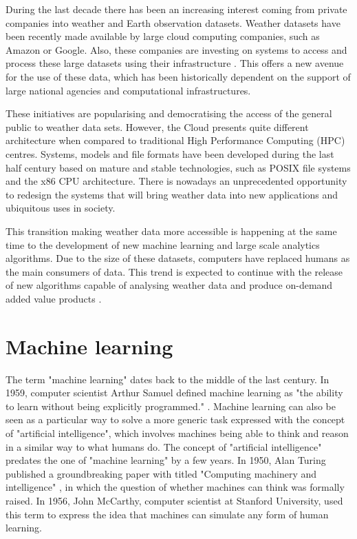 \medskip

During the last decade there has been an increasing interest coming from private companies into weather and Earth observation datasets. Weather datasets have been recently made available by large cloud computing companies, such as Amazon or Google. Also, these companies are investing on systems to access and process these large datasets using their infrastructure \citep{gorelick2017google,earthaws}. This offers a new avenue for the use of these data, which has been historically dependent on the support of large national agencies and computational infrastructures.

\medskip

These initiatives are popularising and democratising the access of the general public to weather data sets. However, the Cloud presents quite different architecture when compared to traditional High Performance Computing (HPC) centres. Systems, models and file formats have been developed during the last half century based on mature and stable technologies, such as POSIX file systems and the x86 CPU architecture. There is nowadays an unprecedented opportunity to redesign the systems that will bring weather data into new applications and ubiquitous uses in society.

\medskip

This transition making weather data more accessible is happening at the same time to the development of new machine learning and large scale analytics algorithms. Due to the size of these datasets, computers have replaced humans as the main consumers of data. This trend is expected to continue with the release of new algorithms capable of analysing weather data and produce on-demand added value products \citep{cloudai,awsml}.


\section{Machine learning}

The term "machine learning" dates back to the middle of the last century. In 1959, computer scientist Arthur Samuel defined machine learning as "the ability to learn without being explicitly programmed." \citep{samuel1959some}. Machine learning can also be seen as a particular way to solve a more generic task expressed with the concept of "artificial intelligence", which involves machines being able to think and reason in a similar way to what humans do. The concept of "artificial intelligence" predates the one of "machine learning" by a few years. In 1950, Alan Turing published a groundbreaking paper with titled "Computing machinery and intelligence" \citep{machinery1950computing}, in which the question of whether machines can think was formally raised. In 1956, John McCarthy, computer scientist at Stanford University, used this term to express the idea that machines can simulate any form of human learning.

